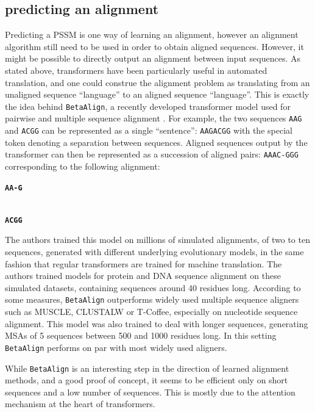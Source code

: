 \documentclass[
  11pt,
  twoside,
  BCOR=10mm,
  listof=totoc]{scrbook}
\begin{document}
\hypertarget{predicting-an-alignment}{%
\subsection{predicting an alignment}\label{predicting-an-alignment}}

Predicting a PSSM is one way of learning an alignment, however an alignment algorithm still need to be used in order to obtain aligned sequences. However, it might be possible to directly output an alignment between input sequences. As stated above, transformers have been particularly useful in automated translation, and one could construe the alignment problem as translating from an unaligned sequence ``language'' to an aligned sequence ``language''. This is exactly the idea behind \texttt{BetaAlign}, a recently developed transformer model used for pairwise and multiple sequence alignment \autocite{dotanHarnessingMachineTranslation2022}. For example, the two sequences \texttt{AAG} and \texttt{ACGG} can be represented as a single ``sentence'': \texttt{AAG\textbar{}ACGG} with the \texttt{\textbar{}} special token denoting a separation between sequences. Aligned sequences output by the transformer can then be represented as a succession of aligned pairs: \texttt{AAAC-GGG} corresponding to the following alignment:

\textbf{\texttt{AA-G}}\strut \\
\textbf{\texttt{ACGG}}

The authors trained this model on millions of simulated alignments, of two to ten sequences, generated with different underlying evolutionary models, in the same fashion that regular transformers are trained for machine translation. The authors trained models for protein and DNA sequence alignment on these simulated datasets, containing sequences around 40 residues long. According to some measures, \texttt{BetaAlign} outperforms widely used multiple sequence aligners such as MUSCLE, CLUSTALW or T-Coffee, especially on nucleotide sequence alignment. This model was also trained to deal with longer sequences, generating MSAs of 5 sequences between 500 and 1000 residues long. In this setting \texttt{BetaAlign} performs on par with most widely used aligners.

While \texttt{BetaAlign} is an interesting step in the direction of learned alignment methods, and a good proof of concept, it seems to be efficient only on short sequences and a low number of sequences. This is mostly due to the attention mechanism at the heart of transformers.
\end{document}
